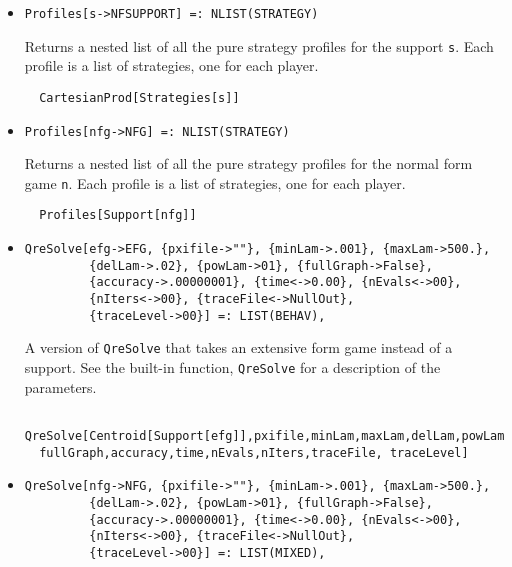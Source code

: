 \begin{itemize}
\bd 
Inserts \verb+x+ as the first element of the list \verb+l+.  
\begin{verbatim}
  {x}&l
\end{verbatim} 
\ed

\item{}
\protect \large \begin{verbatim}
Profiles[s->NFSUPPORT] =: NLIST(STRATEGY) 
\end{verbatim}\normalsize

\bd 
Returns a nested list of all the pure strategy profiles for the support
\verb+s+.  Each profile is a list of strategies, one for each player.  
\begin{verbatim}
  CartesianProd[Strategies[s]]
\end{verbatim} 
\ed


\item{}
\protect \large \begin{verbatim}
Profiles[nfg->NFG] =: NLIST(STRATEGY) 
\end{verbatim}\normalsize

\bd 
Returns a nested list of all the pure strategy profiles for the normal
form game \verb+n+.  Each profile is a list of strategies, one for
each player.
\begin{verbatim}
  Profiles[Support[nfg]]
\end{verbatim} 
\ed


\item{}
\protect \large \begin{verbatim}
QreSolve[efg->EFG, {pxifile->""}, {minLam->.001}, {maxLam->500.}, 
         {delLam->.02}, {powLam->01}, {fullGraph->False}, 
         {accuracy->.00000001}, {time<->0.00}, {nEvals<->00}, 
         {nIters<->00}, {traceFile<->NullOut}, 
         {traceLevel->00}] =: LIST(BEHAV),
\end{verbatim}\normalsize

\bd 
A version of \verb+QreSolve+ that takes an extensive form
game instead of a support.  See the built-in function,
\verb+QreSolve+ for a description of the parameters.
\begin{verbatim}
  QreSolve[Centroid[Support[efg]],pxifile,minLam,maxLam,delLam,powLam, 
  fullGraph,accuracy,time,nEvals,nIters,traceFile, traceLevel]
\end{verbatim} 
\ed

\item{}
\protect \large \begin{verbatim}
QreSolve[nfg->NFG, {pxifile->""}, {minLam->.001}, {maxLam->500.}, 
         {delLam->.02}, {powLam->01}, {fullGraph->False}, 
         {accuracy->.00000001}, {time<->0.00}, {nEvals<->00}, 
         {nIters<->00}, {traceFile<->NullOut}, 
         {traceLevel->00}] =: LIST(MIXED),
\end{verbatim}\normalsize


\end{itemize}
